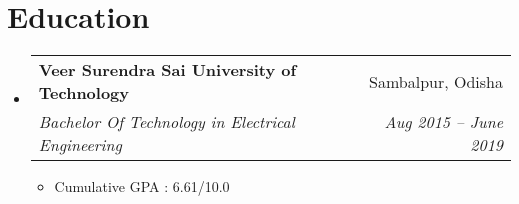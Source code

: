 \documentclass[letterpaper,11pt]{article}
\makeatletter
\newcommand{\resumeItem}[1]{
  \item\small{
    {#1 \vspace{-2pt}}
  }
}
\newcommand{\resumeSubheading}[4]{
  \vspace{-2pt}\item
    \begin{tabular*}{0.97\textwidth}[t]{l@{\extracolsep{\fill}}r}
      \textbf{#1} & #2 \\
      \textit{\small#3} & \textit{\small #4} \\
    \end{tabular*}\vspace{-7pt}
}
\newcommand{\resumeSubHeadingListStart}{\begin{itemize}[leftmargin=0.15in, label={}]}
\newcommand{\resumeSubHeadingListEnd}{\end{itemize}}
\newcommand{\resumeItemListStart}{\begin{itemize}}
\newcommand{\resumeItemListEnd}{\end{itemize}\vspace{-5pt}}
\makeatother
\begin{document}
\section{Education} 
  \resumeSubHeadingListStart
    \resumeSubheading
      {Veer Surendra Sai University of Technology}{Sambalpur, Odisha}
      {Bachelor Of Technology in Electrical Engineering}{Aug 2015 -- June 2019}
       \resumeItemListStart
        \resumeItem{Cumulative GPA : {6.61/10.0}}
      \resumeItemListEnd
  \resumeSubHeadingListEnd

\end{document}
